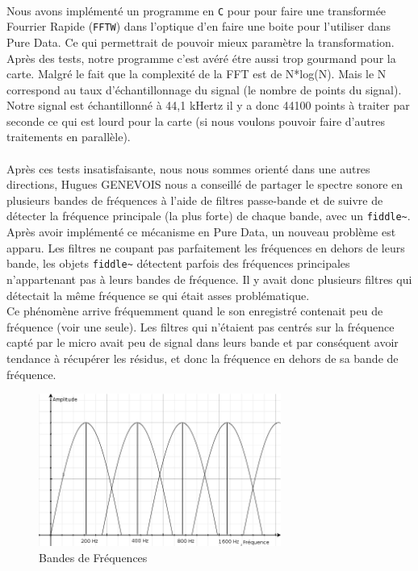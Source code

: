 \documentclass[a4paper, titlepage, oneside, 12pt]{article}%
\begin{document}
\paragraph{}
Nous avons implémenté un programme en \texttt{C} pour pour faire une transformée Fourrier Rapide (\texttt{FFTW}) dans l'optique d'en faire une boite pour l'utiliser dans Pure Data.
Ce qui permettrait de pouvoir mieux paramètre la transformation.\\

Après des tests, notre programme c'est avéré étre aussi trop gourmand pour la carte. Malgré le fait que la complexité de la FFT est de N*log(N). Mais le N correspond au taux d’échantillonnage du signal (le nombre de points du signal). Notre signal est échantillonné à 44,1 kHertz il y a donc 44100 points à traiter par seconde ce qui est lourd pour la carte (si nous voulons pouvoir faire d'autres traitements en parallèle).

\paragraph{}
Après ces tests insatisfaisante, nous nous sommes orienté dans une autres directions, Hugues GENEVOIS nous a conseillé de partager le spectre sonore en plusieurs bandes de fréquences à l'aide de filtres passe-bande et de suivre de détecter la fréquence principale (la plus forte) de chaque bande, avec un \texttt{fiddle\~}.\\
Après avoir implémenté ce mécanisme en Pure Data, un nouveau problème est apparu. Les filtres ne coupant pas parfaitement les fréquences en dehors de leurs bande, les objets \texttt{fiddle\~} détectent parfois des fréquences principales n’appartenant pas à leurs bandes de fréquence. Il y avait donc plusieurs filtres qui détectait la même fréquence se qui était asses problématique.\\
Ce phénomène arrive fréquemment quand le son enregistré contenait peu de fréquence (voir une seule). Les filtres qui n’étaient pas centrés sur la fréquence capté par le micro avait peu de signal dans leurs bande et par conséquent avoir tendance à récupérer les résidus, et donc la fréquence en dehors de sa bande de fréquence.
\begin{figure}[H]
	\centering
	\includegraphics[width=300px]{filtre.jpg}
	\caption{Bandes de Fréquences}
\end{figure}
\end{document}
